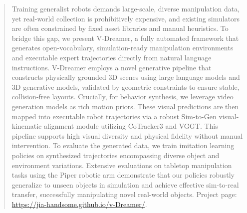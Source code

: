\begin{abstract}
Training generalist robots demands large-scale, diverse manipulation data, yet real-world collection is prohibitively expensive, and existing simulators are often constrained by fixed asset libraries and manual heuristics. To bridge this gap, we present V-Dreamer, a fully automated framework that generates open-vocabulary, simulation-ready manipulation environments and executable expert trajectories directly from natural language instructions. V-Dreamer employs a novel generative pipeline that constructs physically grounded 3D scenes using large language models and 3D generative models, validated by geometric constraints to ensure stable, collision-free layouts. Crucially, for behavior synthesis, we leverage video generation models as rich motion priors. These visual predictions are then mapped into executable  robot trajectories via a robust Sim-to-Gen visual-kinematic alignment module utilizing CoTracker3 and VGGT. 
This pipeline supports high visual diversity and physical fidelity without manual intervention. To evaluate the generated data, we train imitation learning policies on synthesized trajectories encompassing diverse object and environment variations. Extensive evaluations on tabletop manipulation tasks using the Piper robotic arm demonstrate that our policies robustly generalize to unseen objects in simulation and achieve effective sim-to-real transfer, successfully manipulating novel real-world objects.  Project page: \href{https://jia-handsome.github.io/v-Dreamer/}{https://jia-handsome.github.io/v-Dreamer/}.
\end{abstract}
